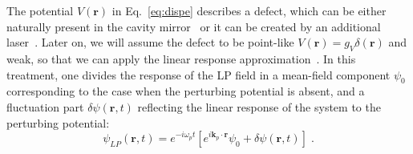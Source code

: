 The potential $V(\bm{r})$ in Eq.~\eqref{eq:dispe} describes a
defect, which can be either naturally present in the cavity
mirror~\cite{Amo_2009} or it can be created by an additional
laser~\cite{Amo_2010}. Later on, we will assume the defect to be
point-like $V(\bm{r})=g_V \delta(\bm{r})$ and weak, so that we can
apply the linear response approximation~\cite{Astrakharchik_2004}.
%
In this treatment, one divides the response of the LP field in a
mean-field component $\psi_0$ corresponding to the case when the
perturbing potential is absent, and a fluctuation part $\delta \psi
(\bm{r},t)$ reflecting the linear response of the system to the
perturbing potential:
%
\begin{equation}
  \psi_{LP} (\bm{r},t) = e^{-i \omega_p t} \left[e^{i \bm{k}_p
      \cdot \bm{r}} \psi_0 + \delta \psi (\bm{r},t)\right] \; .
\label{eq:mfield}
\end{equation}
%



